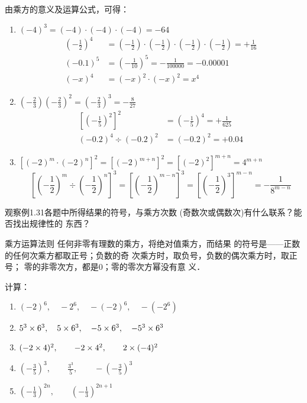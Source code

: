 \begin{solution}
    由乘方的意义及运算公式，可得：
 \begin{enumerate}
     \item $(-4)^3=(-4)\cdot (-4)\cdot (-4)=-64$
     \[\begin{split}
        \left(-\frac{1}{2}\right)^4&=\left(-\frac{1}{2}\right)\cdot\left(-\frac{1}{2}\right)\cdot\left(-\frac{1}{2}\right)\cdot\left(-\frac{1}{2}\right)=+\frac{1}{16}\\
        (-0.1)^5&=\left(-\frac{1}{10}\right)^5=-\frac{1}{100000}=-0.00001\\
        (-x)^4&=(-x)^2\cdot (-x)^2=x^4
     \end{split}\]
\item $\left(-\frac{2}{3}\right)\left(-\frac{2}{3}\right)^2=\left(-\frac{2}{3}\right)^3=-\frac{8}{27}$
\[\begin{split}
    \left[\left(-\frac{1}{5}\right)^2\right]^2&=\left(-\frac{1}{5}\right)^4=+\frac{1}{625}\\
    (-0.2)^4\div (-0.2)^2&=(-0.2)^2=+0.04
\end{split}\]
\item $\left[(-2)^m\cdot (-2)^n\right]^2=[(-2)^{m+n}]^2=[(-2)^2]^{m+n}=4^{m+n}$
\[\left[\left(-\frac{1}{2}\right)^m\div \left(-\frac{1}{2}\right)^n\right]^3=\left[\left(-\frac{1}{2}\right)^{m-n}\right]^3=\left[\left(-\frac{1}{2}\right)^3\right]^{m-n}=-\frac{1}{8^{m-n}}\]
 \end{enumerate}
\end{solution}

观察例1.31各题中所得结果的符号，与乘方次数
(奇数次或偶数次)有什么联系？能否找出规律性的
东西？
  
\begin{blk}{乘方运算法则}
    任何非零有理数的乘方，将绝对值乘方，而结果
的符号是——正数的任何次乘方都取正号；负数的奇
次乘方时，取负号，负数的偶次乘方时，取正号；
  零的非零次方，都是0；零的零次方幂没有意
义．
\end{blk}


\begin{example}
    计算：
\begin{enumerate}
    \item $(-2)^6,\quad -2^6,\quad -(-2)^6,\quad -(-2^6) $
    \item $5^3\times 6^3,\quad 5\times 6^3,\quad -5\times 6^3,\quad -5^3\times 6^3$
    \item $(-2\times 4)^2,\qquad -2\times 4^2,\qquad 2\times (-4)^2$
    \item $\left(-\frac{3}{5}\right)^3,\qquad \frac{3^3}{5},\qquad -\left(-\frac{3}{5}\right)^3$
    \item $\left(-\frac{1}{3}\right)^{2n},\qquad \left(-\frac{1}{3}\right)^{2n+1}$
\end{enumerate}
\end{example}

